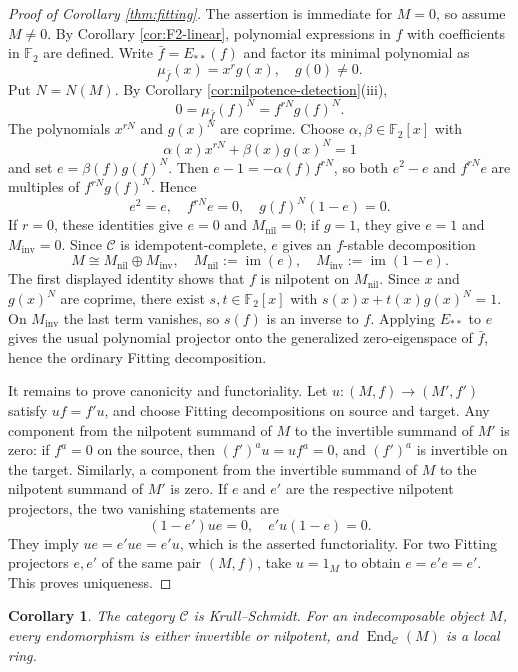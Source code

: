 \documentclass[11pt]{amsart}
\numberwithin{equation}{section}
\newtheorem{corollary}[theorem]{Corollary}
\theoremstyle{definition}
\theoremstyle{remark}
\DeclareMathOperator{\End}{End}
\newcommand{\F}{\mathbb F_2}
\newcommand{\C}{\mathcal C}
\begin{document}
\begin{proof}[Proof of Corollary  \ref{thm:fitting}]
The assertion is immediate for $M=0$, so assume $M\ne0$.  By Corollary
\ref{cor:F2-linear}, polynomial expressions in $f$ with coefficients in
$\F$ are defined.  Write $\bar f=E_{**}(f)$ and factor its minimal polynomial
as
\[
  \mu_{\bar f}(x)=x^r g(x),
  \quad g(0)\ne0.
\]
Put $N=N(M)$.  By Corollary \ref{cor:nilpotence-detection}(iii),
\[
  0=\mu_{\bar f}(f)^N=f^{rN}g(f)^N.
\]
The polynomials $x^{rN}$ and $g(x)^N$ are coprime.  Choose
$\alpha,\beta\in\F[x]$ with
\[
  \alpha(x)x^{rN}+\beta(x)g(x)^N=1
\]
and set $e=\beta(f)g(f)^N$.  Then $e-1=-\alpha(f)f^{rN}$, so both
$e^2-e$ and $f^{rN}e$ are multiples of $f^{rN}g(f)^N$.  Hence
\[
  e^2=e,
  \quad
  f^{rN}e=0,
  \quad
  g(f)^N(1-e)=0.
\]
If $r=0$, these identities give $e=0$ and
$M_{\mathrm{nil}}=0$; if $g=1$, they give $e=1$ and
$M_{\mathrm{inv}}=0$.  
Since $\C$ is idempotent-complete, $e$ gives an $f$-stable decomposition
\[
  M\cong M_{\mathrm{nil}}\oplus M_{\mathrm{inv}},
  \quad
  M_{\mathrm{nil}}:=\operatorname{im}(e),
  \quad
  M_{\mathrm{inv}}:=\operatorname{im}(1-e).
\]
The first displayed identity shows that $f$ is nilpotent on
$M_{\mathrm{nil}}$.  Since $x$ and $g(x)^N$ are coprime, there exist
$s,t\in\F[x]$ with $s(x)x+t(x)g(x)^N=1$.  On
$M_{\mathrm{inv}}$ the last term vanishes, so $s(f)$ is an inverse to $f$.
Applying $E_{**}$ to $e$ gives the usual polynomial projector onto the
generalized zero-eigenspace of $\bar f$, hence the ordinary Fitting
decomposition.

It remains to prove canonicity and functoriality.  Let
$u\colon(M,f)\to(M',f')$ satisfy $uf=f'u$, and choose Fitting decompositions
on source and target.  Any component from the nilpotent summand of $M$ to the
invertible summand of $M'$ is zero: if $f^a=0$ on the source, then
$(f')^a u=uf^a=0$, and $(f')^a$ is invertible on the target.  Similarly, a
component from the invertible summand of $M$ to the nilpotent summand of $M'$
is zero.  If $e$ and $e'$ are the respective nilpotent projectors, the two
vanishing statements are
\[
  (1-e')ue=0,
  \quad
  e'u(1-e)=0.
\]
They imply $ue=e'ue=e'u$, which is the asserted functoriality.  For two
Fitting projectors $e,e'$ of the same pair $(M,f)$, take $u=1_M$ to obtain
$e=e'e=e'$.  This proves uniqueness.
\end{proof}

\begin{corollary}\label{cor:krull-schmidt}
The category $\C$ is Krull--Schmidt.  
For an indecomposable object $M$, every endomorphism is either invertible or
nilpotent, and $\End_{\C}(M)$ is a local ring.
\end{corollary}
\end{document}

